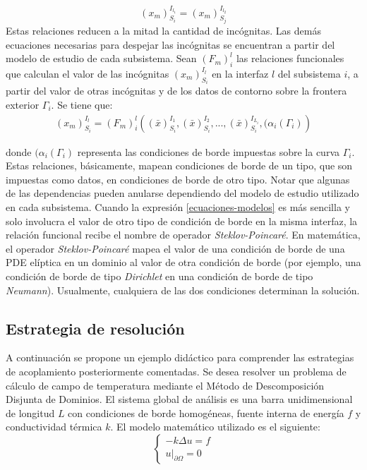 \begin{equation}
{(x_m)_{S_i}^{I_{l_1}}}={(x_m)_{S_j}^{I_{l_2}}}
\label{continuidad}
\end{equation}
Estas relaciones reducen a la mitad la cantidad de incógnitas.
Las demás ecuaciones necesarias para despejar las incógnitas se encuentran a partir del modelo de estudio de cada subsistema. 
Sean $(F_m)_{i}^{l}$ las relaciones funcionales que calculan el valor de las incógnitas ${(x_m)_{S_i}^{I_l}}$ en la interfaz $l$ del subsistema $i$,
a partir del valor de otras incógnitas y de los datos de contorno sobre la frontera exterior $\Gamma_i$.
Se tiene que:
\begin{equation}
\begin{split}
  (x_m)_{S_i}^{I_l} = (F_m)_{i}^{l} \left ( (\bar{x})_{S_i}^{I_1}, (\bar{x})_{S_i}^{I_2}, ..., 
  (\bar{x})_{S_i}^{I_{L_i}}, (\alpha_i({\Gamma_i}) \right )
\end{split}
\label{ecuaciones-modelos}
\end{equation}

donde $(\alpha_i({\Gamma_i})$ representa las condiciones de borde impuestas sobre la curva $\Gamma_i$.
Estas relaciones, básicamente, mapean condiciones de borde de un tipo, que son impuestas como datos, en condiciones de borde de otro tipo.
Notar que algunas de las dependencias pueden anularse dependiendo del modelo de estudio utilizado en cada subsistema.
Cuando la expresión \ref{ecuaciones-modelos} es más sencilla y solo involucra el valor de otro tipo de condición de borde en la misma interfaz,
la relación funcional recibe el nombre de operador \textit{Steklov-Poincaré}.
En matemática, el operador \textit{Steklov-Poincaré} mapea el valor de una condición de borde de una PDE elíptica en un dominio al valor
de otra condición de borde (por ejemplo, una condición de borde de tipo \textit{Dirichlet} en una condición de borde de tipo \textit{Neumann}).
Usualmente, cualquiera de las dos condiciones determinan la solución.

\subsection*{Estrategia de resolución}
\label{1:ecuaciones}

A continuación se propone un ejemplo didáctico para comprender las estrategias de acoplamiento posteriormente comentadas. 
Se desea resolver un problema de cálculo de campo de temperatura mediante el Método de Descomposición Disjunta de Dominios.
El sistema global de análisis es una barra unidimensional de longitud $L$ con condiciones de borde homogéneas, fuente interna de energía $f$ y conductividad térmica $k$.
El modelo matemático utilizado es el siguiente:
\begin{equation}
\left\{\begin{matrix}
-k \Delta u=f \\
\left.u\right|_{\partial\Omega}=0
\end{matrix}\right.
\label{ecuacion-calor}
\end{equation}


